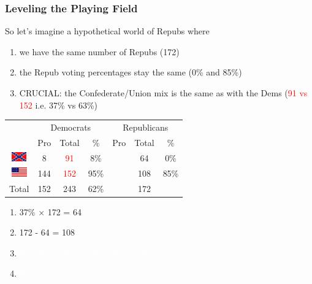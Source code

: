 \documentclass[slides]{beamer}\usepackage[]{graphicx}\usepackage[]{color}
\newcommand{\blue}[1]{\textcolor{blue2}{#1}}
\begin{document}
\begin{frame}
\frametitle{Leveling the Playing Field}
\begin{small}
So let's imagine a hypothetical world of Repubs where
\begin{enumerate}
\item we have the same number of Repubs (172)
\item the Repub voting percentages stay the same (0\% and 85\%)
\item CRUCIAL: the Confederate/Union mix is the same as with the Dems (\textcolor{red}{91 vs 152} i.e. 37\% vs 63\%) 
\end{enumerate}
\end{small}


\begin{center}
	\begin{tabular}{c|ccc|ccc}
     & \multicolumn{3}{c|}{Democrats}  & \multicolumn{3}{c}{Republicans} \\ 
     & Pro & Total & \% & Pro & Total & \% \\ 
     \hline
     \includegraphics[height=0.4cm]{conf} & 8 & \textcolor{red}{91} & 8\% &  & 64 & 0\% \\ 
	 \includegraphics[height=0.4cm]{union} & 144 & \textcolor{red}{152} & 95\% &  & 108 & 85\% \\ 
    \hline
     Total & 152 & 243 & 62\% & & 172 & \blue{} \\ 
  \end{tabular}
\end{center}

\begin{enumerate}
\item 37\% $\times$ 172 = 64
\item 172 - 64 = 108
\item[] \textcolor{white}{64 $\times$ 0\% = 0 and 108 $\times$ 85\% = 92}
\item[] \textcolor{white}{92/(92+172) = 53\%}
\end{enumerate}

\end{frame}
\end{document}
